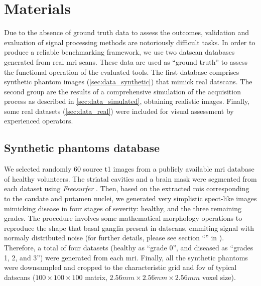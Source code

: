 \documentclass{frontiers}
\newcommand{\cbstart}{\relax}
\newcommand{\cbend}{\relax}
\begin{document}
\section{Materials}\label{sec:data}

Due to the absence of ground truth data to assess the outcomes, validation and evaluation 
  of signal processing methods are notoriously difficult tasks.
\cbstart
In order to produce a reliable benchmarking framework, we use two 
  \gls*{datscan} databases generated from real \gls*{mri} scans.
These data are used as ``ground truth'' to assess the functional operation
  of the evaluated tools.
The first database comprises synthetic phantom images (\autoref{sec:data_synthetic})
  that mimick real \glspl*{datscan}.
The second group are the results of a comprehensive simulation of the acquisition 
  process as described in \autoref{sec:data_simulated}, obtaining realistic images.
Finally, some real datasets (\autoref{sec:data_real}) were included for visual 
  assessment by experienced operators.
\cbend

\subsection{Synthetic phantoms database} %
\label{sec:data_synthetic}
We selected randomly 60 source \gls*{t1} images from a publicly available
  \gls*{mri} database \citep{hill_ixi_2006} of healthy volunteers.
The striatal cavities and a brain mask were segmented from each dataset
  using \emph{Freesurfer} \citep{fischl_freesurfer_2012}.
Then, based on the extracted \glspl*{roi} corresponding to the caudate and putamen
  nuclei, we generated very simplistic \gls*{spect}-like images mimicking disease in
  four stages of severity: healthy, and the three remaining grades.
\cbstart
The procedure involves some mathematical morphology operations to reproduce the
  shape that basal ganglia present in \glspl*{datscan}, emmiting signal with
  normaly distributed noise (for further details, please see section 
  ``'' in ).
\cbend
Therefore, a total of four datasets (healthy as ``grade 0'',
  and diseased as ``grades 1, 2, and 3'') were generated from each \gls*{mri}.
Finally, all the synthetic phantoms were downsampled and cropped to the characteristic
  grid and \acrlong*{fov} of typical \glspl*{datscan} ($100\times100\times100$ matrix,
  $2.56mm\times2.56mm\times2.56mm$ voxel size).
\end{document}
